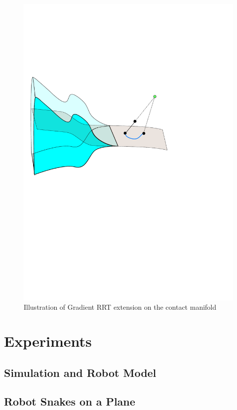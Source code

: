 \documentclass[../thesis.tex]{subfiles}
\begin{document}
\begin{figure}
  \centering
  \includegraphics[width=.5\linewidth]{./Planning/extend.pdf}
  
  \caption{Illustration of Gradient RRT extension on the contact manifold}
  \label{fig:Extend}
\end{figure}


\section{Experiments}
\subsection{Simulation and Robot Model}
\subsection{Robot Snakes on a Plane}
\end{document}
